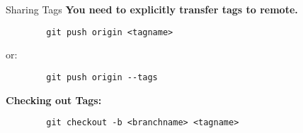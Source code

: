 \begin{frame}[fragile]{Sharing Tags}
    \textbf{You need to explicitly transfer tags to remote.}
    \begin{lstlisting}
        git push origin <tagname>
    \end{lstlisting}
    or:
    \begin{lstlisting}
        git push origin --tags
    \end{lstlisting}
    \textbf{Checking out Tags:}
    \begin{lstlisting}
        git checkout -b <branchname> <tagname>
    \end{lstlisting}
\end{frame}
